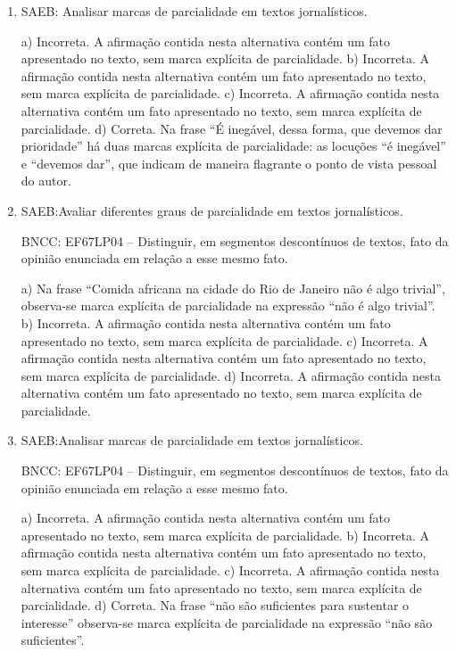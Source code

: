 \begin{enumerate}

\item
SAEB: Analisar marcas de parcialidade em textos jornalísticos.

a) Incorreta. A afirmação contida nesta alternativa contém um fato apresentado no texto, 
sem marca explícita de parcialidade. 
b) Incorreta. A afirmação contida nesta alternativa contém um fato apresentado no texto, 
sem marca explícita de parcialidade. 
c) Incorreta. A afirmação contida nesta alternativa contém um fato apresentado no texto, 
sem marca explícita de parcialidade.
d) Correta. Na frase  ``É inegável, dessa forma, que devemos dar prioridade'' há duas marcas
explícita de parcialidade: as locuções ``é inegável'' e ``devemos dar'', que indicam de maneira
flagrante o ponto de vista pessoal do autor. 

\item
SAEB:Avaliar diferentes graus de parcialidade em textos jornalísticos.

BNCC: EF67LP04 -- Distinguir, em segmentos descontínuos de textos,
fato da opinião enunciada em relação a esse mesmo fato.

a) Na frase  ``Comida africana na cidade do Rio de Janeiro não é algo trivial'', observa-se marca
explícita de parcialidade na expressão ``não é algo trivial''. 
b) Incorreta. A afirmação contida nesta alternativa contém um fato apresentado no texto, 
sem marca explícita de parcialidade. 
c) Incorreta. A afirmação contida nesta alternativa contém um fato apresentado no texto, 
sem marca explícita de parcialidade. 
d) Incorreta. A afirmação contida nesta alternativa contém um fato apresentado no texto, 
sem marca explícita de parcialidade. 

\item
SAEB:Analisar marcas de parcialidade em textos jornalísticos.

BNCC: EF67LP04 -- Distinguir, em segmentos descontínuos de textos,
fato da opinião enunciada em relação a esse mesmo fato.

a) Incorreta. A afirmação contida nesta alternativa contém um fato apresentado no texto, 
sem marca explícita de parcialidade. 
b) Incorreta. A afirmação contida nesta alternativa contém um fato apresentado no texto, 
sem marca explícita de parcialidade. 
c) Incorreta. A afirmação contida nesta alternativa contém um fato apresentado no texto, 
sem marca explícita de parcialidade.
d) Correta. Na frase  ``não são suficientes para sustentar o interesse'' observa-se marca
explícita de parcialidade na expressão ``não são suficientes''. 

\end{enumerate}

